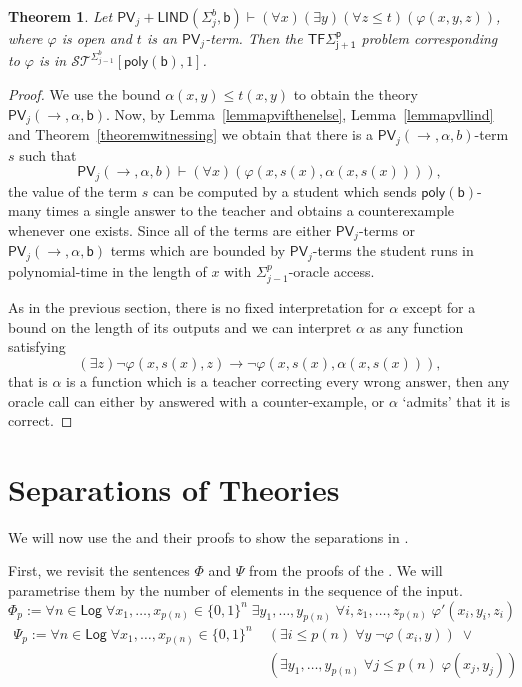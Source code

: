 \documentclass[11pt]{article}
\newcommand{\poly}{\mathsf{poly}}
\newcommand{\PV}{\mathsf{PV}}
\newcommand{\bd}{\mathsf{b}}
\newtheorem{theorem}{Theorem}[section]
\theoremstyle{definition}
\theoremstyle{definition}
\theoremstyle{remark}
\begin{document}
\begin{theorem}\label{thm:lindwitness}
    Let $\PV_j+\mathsf{LIND}(\Sigma^b_j,\bd)\vdash (\forall x)(\exists y)(\forall z\leq t)(\varphi(x,y,z))$, where $\varphi$ is open and $t$ is an $\PV_j$-term. Then the $\mathsf{TF\Sigma^p_{j+1}}$ problem corresponding to $\varphi$ is in $\mathcal{ST}^{\Sigma^b_{j-1}}[\poly(\bd),1]$. 
\end{theorem}
\begin{proof}
    We use the bound $\alpha(x,y)\leq t(x,y)$ to obtain the theory $\PV_j(\to,\alpha,\bd)$. Now, by Lemma~\ref{lemmapvifthenelse}, Lemma~\ref{lemmapvllind} and Theorem~\ref{theoremwitnessing} we obtain that there is a $\PV_j(\to,\alpha,b)$-term $s$ such that
    \[\PV_j(\to,\alpha,b)\vdash (\forall x)(\varphi(x,s(x),\alpha(x,s(x)))),\]
    the value of the term $s$ can be computed by a student which sends $\poly(\bd)$-many times a single answer to the teacher and obtains a counterexample whenever one exists. Since all of the terms are either $\PV_j$-terms or $\PV_j(\to,\alpha,\bd)$ terms which are bounded by $\PV_j$-terms the student runs in polynomial-time in the length of $x$ with $\Sigma^p_{j-1}$-oracle access.

    As in the previous section, there is no fixed interpretation for $\alpha$ except for a bound on the length of its outputs and we can interpret $\alpha$ as any function satisfying
    \[(\exists z)\lnot \varphi(x,s(x),z) \to \lnot \varphi(x,s(x),\alpha(x,s(x))),\]
    that is $\alpha$ is a function which is a teacher correcting every wrong answer, then any oracle call can either by answered with a counter-example, or $\alpha$ `admits' that it is correct.
\end{proof}



\section{Separations of Theories}\label{sec:separations}

We will now use the  and their proofs to show the separations in .

First, we revisit the sentences $\Phi$ and $\Psi$ from the proofs of the . We will parametrise them by the number of elements in the sequence of the input.
$$
\Phi_{p}:= \forall n\in \mathsf{Log}\; \forall x_1,\dots,x_{p(n)}\in \{0,1\}^n\; \exists y_1,\dots,y_{p(n)} \;\forall i,z_1,\dots,z_{p(n)}\; \varphi'(x_i,y_i,z_i)
$$
\begin{align*}
    \Psi_{p}:= \forall n\in \mathsf{Log}\; \forall x_1,\dots,x_{p(n)}\in \{0,1\}^n\; &\left( \exists i\leq p(n) \; \forall y \;\neg \varphi(x_i,y)\right)\; 
\lor\\ &\left( \exists y_1,\dots,y_{p(n)} \; \forall j\leq p(n)\; \varphi(x_j,y_j) \right)
\end{align*}
\end{document}
